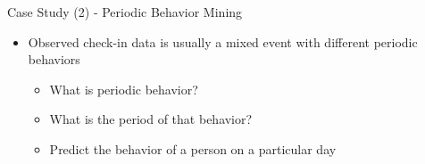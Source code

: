 \documentclass[
 size=14pt,
 paper=smartboard,  %
 mode=present, 		%
 display=slides, 	%
 style=tuliplab,  	%
 pauseslide,
 fleqn,leqno]{powerdot}{}
\begin{document}
\begin{slide}[toc=,bm=]{Case Study (2) - Periodic Behavior Mining}

\begin{itemize}
\item
Observed check-in data is usually a mixed event with different periodic behaviors

\begin{itemize}
\item
What is periodic behavior?

\item
What is the period of that behavior?

\item
Predict the behavior of a person on a particular day
\end{itemize}
\end{itemize}



\end{slide}
\end{document}
